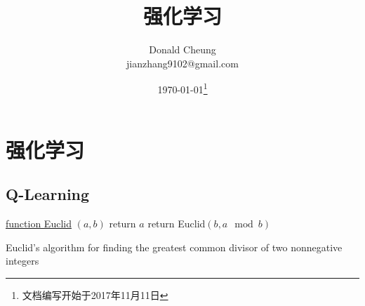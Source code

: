 \ifx\notes\undefined
    \providecommand{\notesroot}{../../..}
    \providecommand{\demoroot}{.}

    \title{强化学习}
    \author{Donald Cheung\\jianzhang9102@gmail.com}
    \date{\today\footnote{文档编写开始于2017年11月11日}}

    
\else
    \providecommand{\demoroot}{\notesroot/tex/template/book}
\fi

\chapter{强化学习}

\section{Q-Learning}

\begin{figure}[ht]
    \centering
    \label{fig:mcts_approach}
\end{figure}

\begin{algorithm}

    \underline{function Euclid} $(a,b)$\;
      {
        return $a$\;
      }
      {
        return Euclid$(b,a\mod b)$\;
      }
    \caption{Euclid's algorithm for finding the greatest common divisor of two nonnegative integers}
\end{algorithm}

\ifx\notes\undefined
    
\fi

